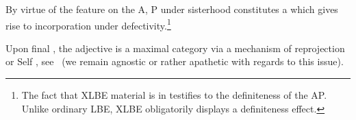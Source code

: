 \documentclass[output=paper]{langsci/langscibook}
\begin{document}
By virtue of the \Def{} feature on the A, P under sisterhood
constitutes a  which gives rise to incorporation under
defectivity.\footnote{The fact that XLBE material is in  testifies
    to the definiteness of the AP. Unlike ordinary \gls{LBE}, XLBE obligatorily displays a definiteness effect.}

\begin{exe}
	\ex

	\hfill\null
	\label{der3}
\end{exe}

Upon final , the adjective is a maximal category via a mechanism
of reprojection or Self , see~ (we remain agnostic or
rather apathetic with regards to this issue).
\end{document}
